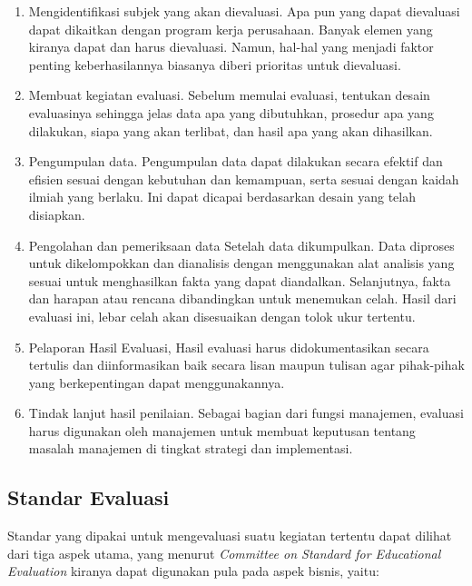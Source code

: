 \begin{enumerate}
	\item Mengidentifikasi subjek yang akan dievaluasi. Apa pun yang dapat dievaluasi dapat dikaitkan dengan program kerja perusahaan. Banyak elemen yang kiranya dapat dan harus dievaluasi. Namun, hal-hal yang menjadi faktor penting keberhasilannya biasanya diberi prioritas untuk dievaluasi.
	\item Membuat kegiatan evaluasi. Sebelum memulai evaluasi, tentukan desain evaluasinya sehingga jelas data apa yang dibutuhkan, prosedur apa yang dilakukan, siapa yang akan terlibat, dan hasil apa yang akan dihasilkan.
	\item Pengumpulan data. Pengumpulan data dapat dilakukan secara efektif dan efisien sesuai dengan kebutuhan dan kemampuan, serta sesuai dengan kaidah ilmiah yang berlaku. Ini dapat dicapai berdasarkan desain yang telah disiapkan.
	\item Pengolahan dan pemeriksaan data Setelah data dikumpulkan. Data diproses untuk dikelompokkan dan dianalisis dengan menggunakan alat analisis yang sesuai untuk menghasilkan fakta yang dapat diandalkan. Selanjutnya, fakta dan harapan atau rencana dibandingkan untuk menemukan celah. Hasil dari evaluasi ini, lebar celah akan disesuaikan dengan tolok ukur tertentu.
	\item Pelaporan Hasil Evaluasi, Hasil evaluasi harus didokumentasikan secara tertulis dan diinformasikan baik secara lisan maupun tulisan agar pihak-pihak yang berkepentingan dapat menggunakannya.
	\item Tindak lanjut hasil penilaian. Sebagai bagian dari fungsi manajemen, evaluasi harus digunakan oleh manajemen untuk membuat keputusan tentang masalah manajemen di tingkat strategi dan implementasi.
\end{enumerate}

\subsection{Standar Evaluasi}
Standar yang dipakai untuk mengevaluasi suatu kegiatan tertentu dapat dilihat dari tiga aspek utama, yang menurut \textit{Committee on Standard for Educational Evaluation} kiranya dapat digunakan pula pada aspek bisnis, yaitu: 

